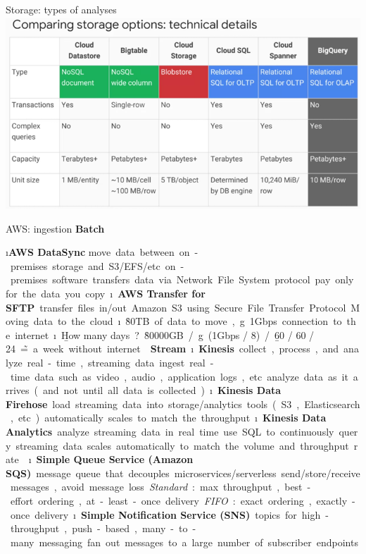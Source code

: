 \begin{frame}[allowframebreaks]{Storage: types of analyses}
\includegraphics[width=\linewidth]{imgs/gc_storage_analyses.png}
\end{frame}

\begin{frame}[allowframebreaks]{AWS: ingestion}
\textbf{Batch}

\i \textbf{AWS DataSync}
\si move data between on-premises storage and S3/EFS/etc.
\si on-premises software transfers data via Network File System protocol
\si pay only for the data you copy

\i \textbf{AWS Transfer for SFTP} 
\si transfer files in/out Amazon S3 using Secure File Transfer Protocol

Moving data to the cloud
\i \r{80TB} of data to move, \g{1Gbps} connection to the internet
\i \b{How many days}? 
\si \r{80000GB} / \g{(1Gbps / 8)} / \b{60 / 60 / 24} \~= a week without internet


\framebreak

\textbf{Stream}

\i \textbf{Kinesis} 
\si collect, process, and analyze real-time, streaming data
\si ingest real-time data such as video, audio, application logs, etc. 
\si analyze data as it arrives (and not until all data is collected)

\i \textbf{Kinesis Data Firehose}
\si load streaming data into storage/analytics
tools (S3, Elasticsearch, etc.)
\si automatically scales to match the throughput

\i \textbf{Kinesis Data Analytics}
\si analyze streaming data in real time
\si use SQL to continuously query streaming data
\si scales automatically to match the volume and throughput rate

\framebreak

\i \textbf{Simple Queue Service (Amazon SQS)} 
\si message queue that decouples microservices/serverless
\si send/store/receive messages, avoid message loss
\si \textit{Standard}: max. throughput, best-effort ordering, at-least-once delivery
\si \textit{FIFO}: exact ordering, exactly-once delivery

\i \textbf{Simple Notification Service (SNS)}
\si topics for high-throughput, push-based, many-to-many messaging
\si fan out messages to a large number of subscriber endpoints
\end{frame}

